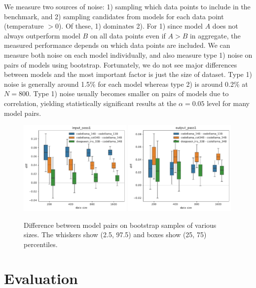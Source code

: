 \documentclass{article}
\begin{document}
We measure two sources of noise: 1) sampling which data points to include in the benchmark, and 2) sampling candidates from models for each data point (temperature $>0$). Of these, 1) dominates 2). For 1) since model $A$ does not always outperform model $B$ on all data points even if $A>B$ in aggregate, the measured performance depends on which data points are included. We can measure both noise on each model individually, and also measure type 1) noise on pairs of models using bootstrap. Fortunately, we do not see major differences between models and the most important factor is just the size of dataset. Type 1) noise is generally around 1.5\% for each model whereas type 2) is around 0.2\% at $N=800$. Type 1) noise usually becomes smaller on pairs of models due to correlation, yielding statistically significant results at the $\alpha=0.05$ level for many model pairs.

\begin{figure}[H]
    \centering
    \includegraphics[width=0.49\textwidth] {figs/wrong_order/wrong_order_box_input_pass1.pdf}
    \includegraphics[width=0.49\textwidth]{figs/wrong_order/wrong_order_box_output_pass1.pdf}
    \caption{Difference between model pairs on bootstrap samples of various sizes. The whiskers show (2.5, 97.5) and boxes show (25, 75) percentiles. }
    \label{fig:benchmark-filtering-size-selection}
\end{figure}

\section{Evaluation} \label{sec:evaluation}
\end{document}
